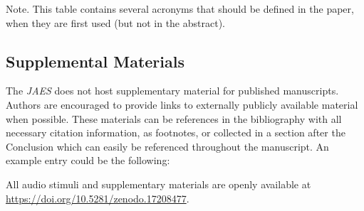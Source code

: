\documentclass[fleqn,draft]{jaes}
\begin{document}
\begin{table}[tb]
\centering
\caption{Tables should have a brief caption. Highlighting the best result(s) is helpful to readers. Highlighting should use bold font, color or shaded cells are not acceptable. Numbers should be decimal aligned while text is left aligned.}
\label{table:an_example_table}
\begin{tabnote}
Note. This table contains several acronyms that should be defined in the paper, when they are first used (but not in the abstract).
\end{tabnote}
\end{table}

\subsection{Supplemental Materials}

The \emph{JAES} does not host supplementary material for published manuscripts. Authors are encouraged to provide links to externally publicly available material when possible. These materials can be references in the bibliography with all necessary citation information, as footnotes, or collected in a section after the Conclusion which can  easily be referenced throughout the manuscript. An example entry could be the following: 

All audio stimuli and supplementary materials are openly available at \href{https://doi.org/10.5281/zenodo.17208477}{https://doi.org/10.5281/zenodo.17208477}.
\end{document}
